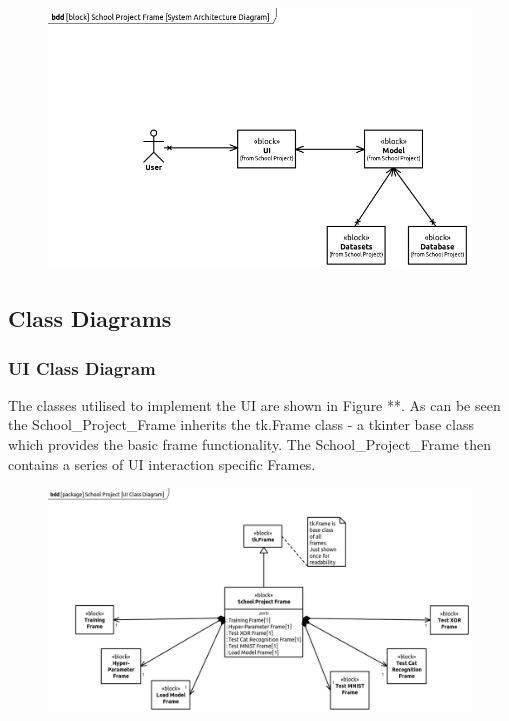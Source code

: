 \documentclass[./project-report/src/latex/project-report.tex]{subfiles}
\begin{document}
\begin{figure}[h!]
\centering
\includegraphics[width=1\textwidth]{./project-report/src/images/system-architecture-diagram.png}
\end{figure}

\pagebreak

\subsection{Class Diagrams}

\subsubsection{UI Class Diagram}

The classes utilised to implement the UI are shown in Figure **. As can be seen the School\_Project\_Frame inherits the tk.Frame class - a tkinter base class which provides 
the basic frame functionality. The School\_Project\_Frame then contains a series of UI interaction specific Frames.

\begin{figure}[h!]
\centering
\includegraphics[width=1\textwidth]{./project-report/src/images/ui-class-diagram.png}
\end{figure}
\end{document}
